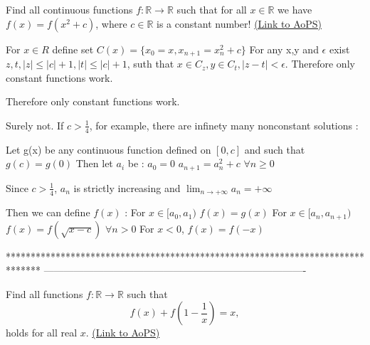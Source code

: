 \begin{problem}
	Find all continuous functions $f: \mathbb{R}\rightarrow\mathbb{R}$ such that for all $x\in\mathbb{R}$ we have $f(x)=f(x^{2}+c)$, where $c\in \mathbb R$ is a constant number!
	\flushright \href{https://artofproblemsolving.com/community/c6h152296}{(Link to AoPS)}
\end{problem}



\begin{mysolution}
	For $x\in R$ define set $C(x)=\{x_{0}=x,x_{n+1}=x_{n}^{2}+c\}$
For any x,y and $\epsilon$ exist $z,t, |z|\le |c|+1,|t|\le |c|+1$, suth that $x\in C_{z}, y\in C_{t}, |z-t|<\epsilon$.
Therefore only constant functions work.
\end{mysolution}



\begin{mysolution}
	\begin{tcolorbox} Therefore only constant functions work.\end{tcolorbox}

Surely not.
If $c>\frac{1}{4}$, for example, there are infinety many nonconstant solutions :

Let g(x) be any continuous function defined on $[0,c]$ and such that $g(c)=g(0)$
Then let $a_{i}$ be :
$a_{0}=0$
$a_{n+1}=a_{n}^{2}+c$ $\forall n\geq 0$

Since $c>\frac{1}{4}$, $a_{n}$ is strictly increasing and $\lim_{n\rightarrow+\infty}a_{n}=+\infty$

Then we can define $f(x)$ :
For $x\in[a_{0},a_{1})$ $f(x)=g(x)$
For $x\in[a_{n},a_{n+1})$ $f(x)=f(\sqrt{x-c})$ $\forall n>0$
For $x<0$, $f(x)=f(-x)$
\end{mysolution}
*******************************************************************************
-------------------------------------------------------------------------------

\begin{problem}
	Find all functions $f : \mathbb R \to \mathbb R$ such that
\[f(x)+f\left(1-\frac{1}{x}\right)=x,\]
holds for all real $x$.
	\flushright \href{https://artofproblemsolving.com/community/c6h152490}{(Link to AoPS)}
\end{problem}



